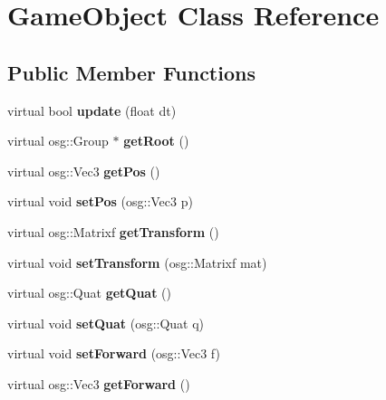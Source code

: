 \hypertarget{class_game_object}{
\section{GameObject Class Reference}
\label{class_game_object}
}
\subsection*{Public Member Functions}
\begin{DoxyCompactItemize}
\item 
\hypertarget{class_game_object_a8f4b4186f062ede4188e1745bc450b23}{
virtual bool {\bfseries update} (float dt)}
\label{class_game_object_a8f4b4186f062ede4188e1745bc450b23}

\item 
\hypertarget{class_game_object_ae60d7a8dea0116764e938544b8349879}{
virtual osg::Group $\ast$ {\bfseries getRoot} ()}
\label{class_game_object_ae60d7a8dea0116764e938544b8349879}

\item 
\hypertarget{class_game_object_ab0e8472c3e3f0a203e1dab9d87662e4a}{
virtual osg::Vec3 {\bfseries getPos} ()}
\label{class_game_object_ab0e8472c3e3f0a203e1dab9d87662e4a}

\item 
\hypertarget{class_game_object_a5009de71fe859b1fbcb8ac57f5142d0f}{
virtual void {\bfseries setPos} (osg::Vec3 p)}
\label{class_game_object_a5009de71fe859b1fbcb8ac57f5142d0f}

\item 
\hypertarget{class_game_object_aa549e2af1d65ce2c2eaeaebfd06382d9}{
virtual osg::Matrixf {\bfseries getTransform} ()}
\label{class_game_object_aa549e2af1d65ce2c2eaeaebfd06382d9}

\item 
\hypertarget{class_game_object_ad12ba3902ef5001a1cd7039cd2b41426}{
virtual void {\bfseries setTransform} (osg::Matrixf mat)}
\label{class_game_object_ad12ba3902ef5001a1cd7039cd2b41426}

\item 
\hypertarget{class_game_object_a119cb2e3915e07474a79d812562c3469}{
virtual osg::Quat {\bfseries getQuat} ()}
\label{class_game_object_a119cb2e3915e07474a79d812562c3469}

\item 
\hypertarget{class_game_object_af8b50347475998d0dd80c737504afa12}{
virtual void {\bfseries setQuat} (osg::Quat q)}
\label{class_game_object_af8b50347475998d0dd80c737504afa12}

\item 
\hypertarget{class_game_object_a60c47a20373926f417d6736403f201c6}{
virtual void {\bfseries setForward} (osg::Vec3 f)}
\label{class_game_object_a60c47a20373926f417d6736403f201c6}

\item 
\hypertarget{class_game_object_a5f27095151c3159f78d8a145e7611894}{
virtual osg::Vec3 {\bfseries getForward} ()}
\label{class_game_object_a5f27095151c3159f78d8a145e7611894}

\end{DoxyCompactItemize}

